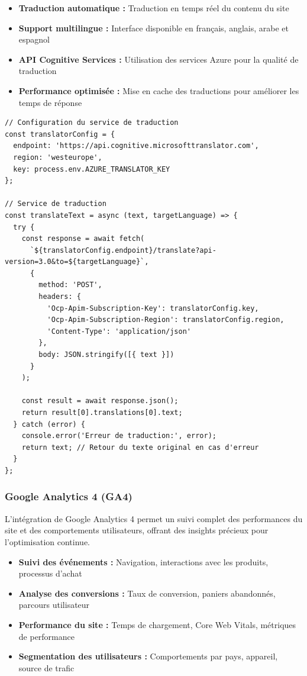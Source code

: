 \documentclass[12pt,a4paper]{article}
\begin{document}
\begin{itemize}
    \item \textbf{Traduction automatique :} Traduction en temps réel du contenu du site
    \item \textbf{Support multilingue :} Interface disponible en français, anglais, arabe et espagnol
    \item \textbf{API Cognitive Services :} Utilisation des services Azure pour la qualité de traduction
    \item \textbf{Performance optimisée :} Mise en cache des traductions pour améliorer les temps de réponse
\end{itemize}

\begin{lstlisting}[caption=Configuration Azure Translator]
// Configuration du service de traduction
const translatorConfig = {
  endpoint: 'https://api.cognitive.microsofttranslator.com',
  region: 'westeurope',
  key: process.env.AZURE_TRANSLATOR_KEY
};

// Service de traduction
const translateText = async (text, targetLanguage) => {
  try {
    const response = await fetch(
      `${translatorConfig.endpoint}/translate?api-version=3.0&to=${targetLanguage}`,
      {
        method: 'POST',
        headers: {
          'Ocp-Apim-Subscription-Key': translatorConfig.key,
          'Ocp-Apim-Subscription-Region': translatorConfig.region,
          'Content-Type': 'application/json'
        },
        body: JSON.stringify([{ text }])
      }
    );
    
    const result = await response.json();
    return result[0].translations[0].text;
  } catch (error) {
    console.error('Erreur de traduction:', error);
    return text; // Retour du texte original en cas d'erreur
  }
};
\end{lstlisting}

\subsubsection{Google Analytics 4 (GA4)}
L'intégration de Google Analytics 4 permet un suivi complet des performances du site et des comportements utilisateurs, offrant des insights précieux pour l'optimisation continue.

\begin{itemize}
    \item \textbf{Suivi des événements :} Navigation, interactions avec les produits, processus d'achat
    \item \textbf{Analyse des conversions :} Taux de conversion, paniers abandonnés, parcours utilisateur
    \item \textbf{Performance du site :} Temps de chargement, Core Web Vitals, métriques de performance
    \item \textbf{Segmentation des utilisateurs :} Comportements par pays, appareil, source de trafic
\end{itemize}
\end{document}
